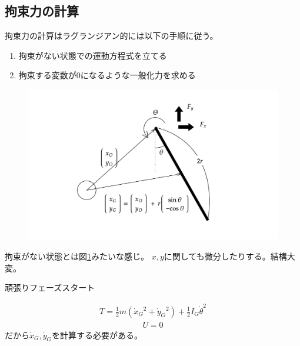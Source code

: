 \documentclass[a4paper,11pt]{jsarticle}
\begin{document}
\subsection{拘束力の計算}
拘束力の計算はラグランジアン的には以下の手順に従う。
\begin{enumerate}
  \item 拘束がない状態での運動方程式を立てる
  \item 拘束する変数が0になるような一般化力を求める
\end{enumerate}

\begin{figure}[t]
  \centering
  \includegraphics[width = 1\textwidth]{007.png}
  \caption{}
  \label{fig:007}
\end{figure}
拘束がない状態とは図\ref{fig:007}みたいな感じ。
$x,y$に関しても微分したりする。結構大変。

頑張りフェーズスタート

\begin{align*}
  T = \frac{1}{2}m(\dot{x}_G{}^2 + \dot{y}_G{}^2) + \frac{1}{2}I_G \dot{\theta}^2
\end{align*}
\begin{align*}
  U = 0
\end{align*}
だから$\dot{x}_G,\dot{y}_G$を計算する必要がある。
\end{document}
